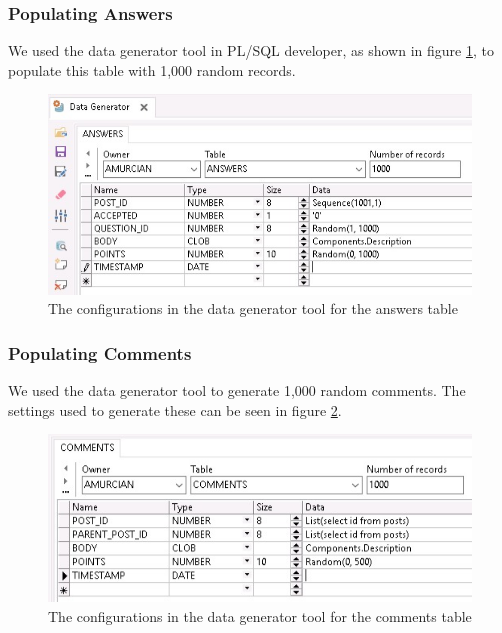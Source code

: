 \subsubsection{Populating Answers}

We used the data generator tool in PL/SQL developer, as shown in figure \ref{answers-generator}, to populate this table with 1,000 random records.

\begin{figure}[htbp]
	\centering
	\includegraphics[width=\linewidth]{images/answers_generator.jpeg}
	\caption{The configurations in the data generator tool for the answers table}
	\label{answers-generator}
\end{figure}

\subsubsection{Populating Comments}

We used the data generator tool to generate 1,000 random comments. The settings used to generate these can be seen in figure \ref{comments-generator}.

\begin{figure}[htbp]
	\centering
	\includegraphics[width=\linewidth]{images/comments_generator.jpeg}
	\caption{The configurations in the data generator tool for the comments table}
	\label{comments-generator}
\end{figure}

